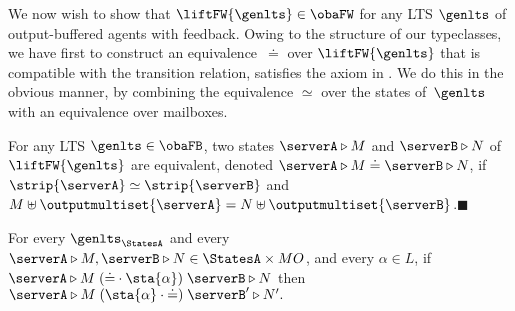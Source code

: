 


We now wish to show that $\liftFW{\genlts} \in \obaFW$ for any LTS
$\genlts$ of output-buffered agents with feedback.
Owing to the structure of our typeclasses, we have first to construct an
equivalence~$\doteq$ over $\liftFW{\genlts}$ that is compatible with the
transition relation, \ie satisfies the axiom in .
We do this in the obvious manner, \ie by combining the equivalence $\simeq$
over the states of~$\genlts$ with an equivalence over mailboxes.

\begin{definition}
  \label{def:fw-eq}
  For any LTS $\genlts \in \obaFB$, two states $\serverA \triangleright M$
  and $\serverB \triangleright N$ of $\liftFW{\genlts}$ are
  equivalent, denoted
  $\serverA \triangleright M \doteq \serverB \triangleright N$, if
  $ \strip{ \serverA } \simeq \strip{ \serverB }$ and
  $M \uplus \outputmultiset{\serverA} = N \uplus
  \outputmultiset{\serverB}$.\hfill$\blacksquare$
\end{definition}

\begin{lemma}
  \label{lem:harmony-sta}
  For every $\genlts_\StatesA$ and every
  $\serverA \triangleright M, \serverB \triangleright N \in \StatesA \times MO$,
  and every $\alpha \in L$, if
  $
  \serverA \triangleright M \mathrel{({\doteq} \cdot {\sta{\alpha}})}
  \serverB \triangleright N
  $ then
  $
  \serverA  \triangleright M \mathrel{({\sta{\alpha}} \cdot {\doteq})} \serverB' \triangleright N'.
  $
\end{lemma}

